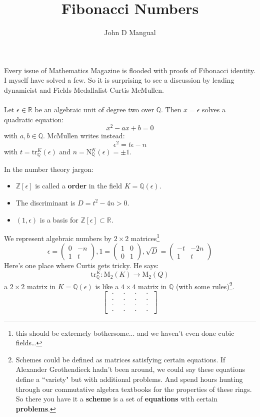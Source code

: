 \documentclass[12pt]{article}
\title{\textbf{ Fibonacci Numbers }}
\author{John D Mangual}
\date{}
\begin{document}
\selectfont \fontsize{24}{30}\selectfont

\maketitle

\noindent Every issue of Mathematics Magazine is flooded with proofs of Fibonacci identity.  I myself have solved a few.  So it is surprising to see a discussion by leading dynamicist and Fields Medallalist Curtis McMullen.  \\ \\
Let $\epsilon \in \mathbb{R}$ be an algebraic unit of degree two over $\mathbb{Q}$.  Then $x = \epsilon$ solves a quadratic equation:
$$ x^2 - ax + b = 0 $$
with $a,b \in \mathbb{Q}$.  McMullen writes instead:
$$ \epsilon^2 = t\epsilon - n $$
with $t = \mathrm{tr}_\mathbb{Q}^K(\epsilon)$ and $n = \mathrm{N}_\mathbb{Q}^K(\epsilon)= \pm 1 $. \newpage

\noindent In the number theory jargon:
\begin{itemize}
\item $\mathbb{Z}[\epsilon]$ is called a \textbf{order} in the field $K = \mathbb{Q}(\epsilon)$.
\item The discriminant is $D = t^2 - 4n > 0$.
\item $(1,\epsilon)$ is a basis for $\mathbb{Z}[\epsilon] \subset \mathbb{R}$.
\end{itemize}
We represent algebraic numbers by $2 \times 2$ matrices\footnote{this should be extremely bothersome... and we haven't even done cubic fields\dots}
$$ \epsilon = \left(
\begin{array}{cr} 
0 & -n \\
1 & t
\end{array}\right), 
 1 = \left(
\begin{array}{cr} 
1 & 0 \\
0 & 1
\end{array}
 \right),
  \sqrt{D} = \left(
\begin{array}{rr} 
-t & -2n \\
1 & t
\end{array}\right)
 $$
Here's one place where Curtis gets tricky.  He says:
$$ \mathrm{tr}_\mathbb{Q}^K: \mathrm{M}_2(K) \to \mathrm{M}_2(Q) $$
a $2 \times 2$ matrix in $K = \mathbb{Q}(\epsilon)$ is like a $4 \times 4$ matrix in $\mathbb{Q}$ (with some rules)\footnote{Schemes could be defined as matrices satisfying certain equations.  If Alexander Grothendieck hadn't been around, we could say these equations define a ``variety" but with additional problems.  And spend hours hunting through our commutative algebra textbooks for the properties of these rings.  So there you have it a \textbf{scheme} is a set of \textbf{equations} with certain \textbf{problems}.}.
$$
\left[
\begin{array}{cc|cc}
\;\cdot \; & \;\cdot \; & \;\cdot \; & \;\cdot \; \\
\;\cdot \; & \;\cdot \; & \;\cdot \; & \;\cdot \; \\ \hline
\;\cdot \; & \;\cdot \; & \;\cdot \; & \;\cdot \; \\
\;\cdot \; & \;\cdot \; & \;\cdot \; & \;\cdot \;  
 \end{array}
 \right]
 $$
 
\end{document}
